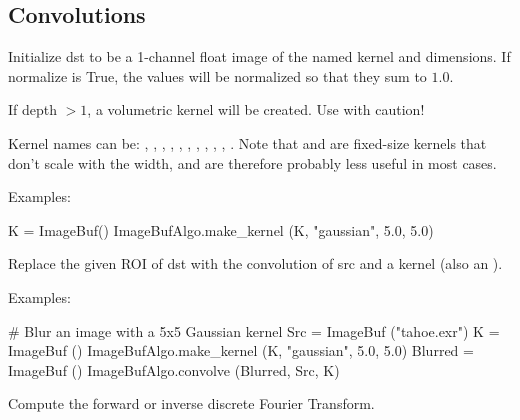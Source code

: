 \subsection{Convolutions}
\label{sec:iba:py:convolutions}

 
Initialize {\cf dst} to be a 1-channel {\cf float} image of the named kernel
and dimensions.  If {\cf normalize} is {\cf True}, the values will be
normalized so that they sum to $1.0$.

If {\cf depth} $> 1$, a volumetric kernel will be created.  Use with
caution!

Kernel names can be: , , ,
, , , ,
, , , . Note that
 and  are fixed-size kernels that don't
scale with the width, and are therefore probably less useful in most
cases.

\smallskip
\noindent Examples:
\begin{code}
    K = ImageBuf()
    ImageBufAlgo.make_kernel (K, "gaussian", 5.0, 5.0)
\end{code}
\apiend


 
Replace the given ROI of {\cf dst} with the convolution of {\cf src} and
a kernel (also an \ImageBuf).

\smallskip
\noindent Examples:
\begin{code}
    # Blur an image with a 5x5 Gaussian kernel
    Src = ImageBuf ("tahoe.exr")
    K = ImageBuf ()
    ImageBufAlgo.make_kernel (K, "gaussian", 5.0, 5.0)
    Blurred = ImageBuf ()
    ImageBufAlgo.convolve (Blurred, Src, K)
\end{code}
\apiend


 
 

Compute the forward or inverse discrete Fourier Transform.

